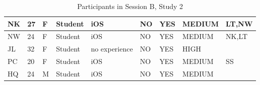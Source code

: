 \begin{table}[H]
{\begin{tabular}{|l|l|l|l|l|l|l|l|l|}
NK       & 27  & F      & Student    & iOS                                                             & NO                                                                 & YES                                                                  & MEDIUM                                                       & LT,NW                                                              \\ \hline
NW       & 24  & F      & Student    & iOS                                                             & NO                                                                 & YES                                                                  & MEDIUM                                                       & NK,LT                                                              \\ \hline
JL       & 32  & F      & Student    & no experience                                                   & NO                                                                 & YES                                                                  & HIGH                                                         &                                                                    \\ \hline
PC       & 20  & F      & Student    & iOS                                                             & NO                                                                 & YES                                                                  & MEDIUM                                                       & SS                                                                 \\ \hline
HQ       & 24  & M      & Student    & iOS                                                             & NO                                                                 & YES                                                                  & MEDIUM                                                       &                                                                    \\ \hline
\end{tabular}}
\caption{Participants in Session B, Study 2}
\end{table}



